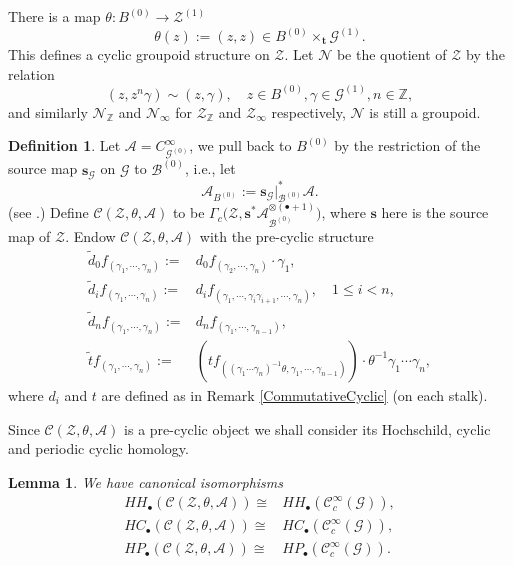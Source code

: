 \documentclass[a4paper]{amsart}
\newcommand{\ZZ}{\mathbb Z}
\newcommand{\maA}{\mathcal A}
\newcommand{\maB}{\mathcal B}
\newcommand{\maC}{\mathcal C}
\newcommand{\maG}{\mathcal G}
\newcommand{\maN}{\mathcal N}
\newcommand{\maZ}{\mathcal Z}
\newcommand{\bs}{\mathbf{s}}
\newcommand{\bt}{\mathbf{t}}
\newcommand\<{\langle}
\renewcommand\>{\rangle}
\newtheorem{lem}[theorem]{Lemma}
\theoremstyle{definition}
\newtheorem{dfn}[theorem]{Definition}
\theoremstyle{remark}
\begin{document}
There is a map $\theta : B ^{(0)} \to \maZ ^{(1)} $
$$ \theta (z ) := (z , z ) \in B ^{(0)} \times _\bt \maG ^{(1)} .$$
This defines a cyclic groupoid structure on $\maZ$.
Let $\maN$ be the quotient of $\maZ $ by the relation
$$ (z , z ^n \gamma ) \sim (z , \gamma ), \quad z \in B ^{(0)}, \gamma \in \maG ^{(1)}, n \in \ZZ , $$
and similarly $\maN _\ZZ $ and $\maN _\infty$ for $\maZ _\ZZ$ and $\maZ _\infty$ respectively,
$\maN$ is still a groupoid.

\begin{dfn}
\label{TwistedLoop}
Let $\maA = C ^\infty _{\maG ^{(0)}}$,
we pull back to $B ^{(0)}$ by the restriction of the source map $\bs _\maG$ on $\maG$ to $\maB ^{(0)}$,
i.e., let
$$\maA _{B ^{(0)}} := \bs _{\maG} \vert _{\maB ^{(0)}} ^* \maA .$$
(see \cite[3.24]{Crainic;EtaleGpoid}.)
Define $\maC (\maZ , \theta , \maA)$ to be $\Gamma _c \big(\maZ , \bs ^* \maA _{\maB ^{(0)}} ^{\otimes (\bullet+1)} \big)$,
where $\bs$ here is the source map of $\maZ$.
Endow $\maC (\maZ , \theta , \maA)$ with the pre-cyclic structure
\begin{align*}
\tilde d_0 f _{(\gamma _1, \cdots , \gamma _n)}
:=& d_0 f _{(\gamma _2 , \cdots , \gamma _n)} \cdot \gamma _1,\\
\tilde d_i f _{(\gamma _1, \cdots , \gamma _n)}
:=& d_i f _{(\gamma _1 , \cdots , \gamma _i \gamma _{i+1} , \cdots , \gamma _n)} , \quad 1 \leq i < n, \\
\tilde d_n f _{(\gamma _1, \cdots , \gamma _n)}
:=& d_n f _{(\gamma _1 , \cdots , \gamma _{n-1})}, \\
\tilde t f _{(\gamma _1 , \cdots , \gamma _n)}
:=& (t f _{((\gamma _1 \cdots \gamma _n)^{-1} \theta , \gamma _1 , \cdots , \gamma _{n-1})})
\cdot \theta ^{-1} \gamma _1 \cdots \gamma _n,
\end{align*}
where $d_i$ and $t$ are defined as in Remark \ref{CommutativeCyclic} (on each stalk).
\end{dfn}

Since $\maC (\maZ , \theta , \maA)$ is a pre-cyclic object we shall consider its Hochschild, cyclic and periodic cyclic homology.

\begin{lem}
\label{Reduction}
\cite[Proposition 3.36, 4.1]{Crainic;EtaleGpoid}
We have canonical isomorphisms
\begin{align*}
H H _\bullet (\maC (\maZ , \theta , \maA)) \cong & H H _\bullet (\maC ^\infty _c (\maG)), \\
H C _\bullet (\maC (\maZ , \theta , \maA)) \cong & H C _\bullet (\maC ^\infty _c (\maG)), \\
H P _\bullet (\maC (\maZ , \theta , \maA)) \cong & H P _\bullet (\maC ^\infty _c (\maG)) .
\end{align*}
\end{lem}
\end{document}
